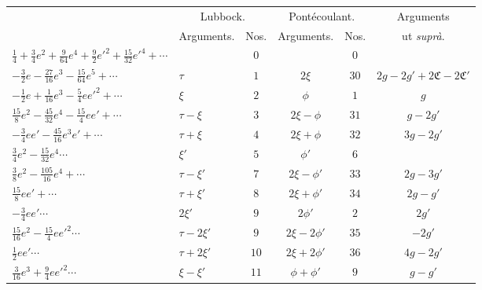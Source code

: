 \documentclass[12pt,a4paper]{article}
\theoremstyle{plain}
\begin{document}
\begin{center}
\small
\begin{tabular}{|l|l|c|c|c|c|}
\hline
& \multicolumn{2}{c|}{Lubbock.} & \multicolumn{2}{c|}{Pont\'ecoulant.} & Arguments \\
\cline{2-5}
& Arguments. & Nos. & Arguments. & Nos. & ut \textit{supr\`a}. \\
\hline
$\tfrac{1}{4}+\tfrac{3}{4}e^{2}+\tfrac{9}{64}e^{4}+\tfrac{9}{2}e'^{2}+\tfrac{15}{32}e'^{4}+\cdots$
                                                          &       & $0$  &        & $0$  & \\
$-\tfrac{3}{2}e-\tfrac{27}{16}e^{3}-\tfrac{15}{64}e^{5}+\cdots$
                                                          & $\tau$ & $1$ & $2\xi$ & $30$ & $2g-2g'+2\mathfrak{C}-2\mathfrak{C}'$ \\
$-\tfrac{1}{2}e+\tfrac{1}{16}e^{3}-\tfrac{5}{4}ee'^{2}+\cdots$
                                                          & $\xi$  & $2$ & $\phi$ & $1$  & $g$ \\
$\tfrac{15}{8}e^{2}-\tfrac{45}{32}e^{4}-\tfrac{15}{4}ee'+\cdots$
                                                          & $\tau-\xi$ & $3$ & $2\xi-\phi$ & $31$ & $g-2g'$ \\
$-\tfrac{3}{4}e e'-\tfrac{45}{16}e^{3}e'+\cdots$
                                                          & $\tau+\xi$ & $4$ & $2\xi+\phi$ & $32$ & $3g-2g'$ \\
$\tfrac{3}{4}e^{2}-\tfrac{15}{32}e^{4}\cdots$
                                                          & $\xi'$ & $5$ & $\phi'$ & $6$ & \\
$\tfrac{3}{8}e^{2}-\tfrac{105}{16}e^{4}+\cdots$
                                                          & $\tau-\xi'$ & $7$ & $2\xi-\phi'$ & $33$ & $2g-3g'$ \\
$\tfrac{15}{8}e e'+\cdots$
                                                          & $\tau+\xi'$ & $8$ & $2\xi+\phi'$ & $34$ & $2g-g'$ \\
$-\tfrac{3}{4}e e'\cdots$
                                                          & $2\xi'$ & $9$ & $2\phi'$ & $2$ & $2g'$ \\
$\tfrac{15}{16}e^{2}-\tfrac{15}{4}e e'^{2}\cdots$
                                                          & $\tau-2\xi'$ & $9$ & $2\xi-2\phi'$ & $35$ & $-2g'$ \\
$\tfrac{1}{2}e e'\cdots$
                                                          & $\tau+2\xi'$ & $10$ & $2\xi+2\phi'$ & $36$ & $4g-2g'$ \\
$\tfrac{3}{16}e^{3}+\tfrac{9}{4}e e'^{2}\cdots$
                                                          & $\xi-\xi'$ & $11$ & $\phi+\phi'$ & $9$ & $g-g'$ \\
\hline
\end{tabular}
\end{center}
\end{document}
